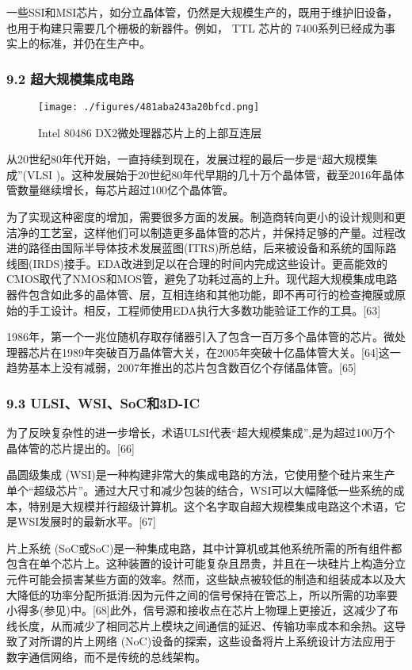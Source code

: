 一些SSI和MSI芯片，如分立晶体管，仍然是大规模生产的，既用于维护旧设备，也用于构建只需要几个栅极的新器件。例如， TTL 芯片的 7400系列已经成为事实上的标准，并仍在生产中。

\subsubsection{9.2 超大规模集成电路}

\begin{figure}[ht]
\centering
\texttt{[image: ./figures/481aba243a20bfcd.png]}
\caption{Intel 80486 DX2微处理器芯片上的上部互连层} \label{fig_icJCDL_8}
\end{figure}

从20世纪80年代开始，一直持续到现在，发展过程的最后一步是“超大规模集成”(VLSI )。这种发展始于20世纪80年代早期的几十万个晶体管，截至2016年晶体管数量继续增长，每芯片超过100亿个晶体管。

为了实现这种密度的增加，需要很多方面的发展。制造商转向更小的设计规则和更洁净的工艺室，这样他们可以制造更多晶体管的芯片，并保持足够的产量。过程改进的路径由国际半导体技术发展蓝图(ITRS)所总结，后来被设备和系统的国际路线图(IRDS)接手。EDA改进到足以在合理的时间内完成这些设计。更高能效的CMOS取代了NMOS和MOS管，避免了功耗过高的上升。现代超大规模集成电路器件包含如此多的晶体管、层，互相连络和其他功能，即不再可行的检查掩膜或原始的手工设计。相反，工程师使用EDA执行大多数功能验证工作的工具。[63]

1986年，第一个一兆位随机存取存储器引入了包含一百万多个晶体管的芯片。微处理器芯片在1989年突破百万晶体管大关，在2005年突破十亿晶体管大关。[64]这一趋势基本上没有减弱，2007年推出的芯片包含数百亿个存储晶体管。[65]

\subsubsection{9.3 ULSI、WSI、SoC和3D-IC}

为了反映复杂性的进一步增长，术语ULSI代表“超大规模集成”,是为超过100万个晶体管的芯片提出的。[66]

晶圆级集成 (WSI)是一种构建非常大的集成电路的方法，它使用整个硅片来生产单个“超级芯片”。通过大尺寸和减少包装的结合，WSI可以大幅降低一些系统的成本，特别是大规模并行超级计算机。这个名字取自超大规模集成电路这个术语，它是WSI发展时的最新水平。[67]

片上系统 (SoC或SoC)是一种集成电路，其中计算机或其他系统所需的所有组件都包含在单个芯片上。这种装置的设计可能复杂且昂贵，并且在一块硅片上构造分立元件可能会损害某些方面的效率。然而，这些缺点被较低的制造和组装成本以及大大降低的功率分配所抵消:因为元件之间的信号保持在管芯上，所以所需的功率要小得多(参见)中。[68]此外，信号源和接收点在芯片上物理上更接近，这减少了布线长度，从而减少了相同芯片上模块之间通信的延迟、传输功率成本和余热。这导致了对所谓的片上网络 (NoC)设备的探索，这些设备将片上系统设计方法应用于数字通信网络，而不是传统的总线架构。

